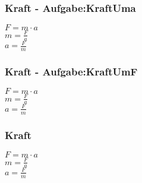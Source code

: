 \subsubsection{Kraft - Aufgabe:KraftUma} 
\begin{minipage}{0.45\textwidth} 
$ F = m\cdot a $\\ 
$ m = \frac{F}{a} $\\ 
$ a = \frac{F}{m} $\\ 
\end{minipage} 
\begin{minipage}{0.45\textwidth} 
 
\end{minipage} 
\subsubsection{Kraft - Aufgabe:KraftUmF} 
\begin{minipage}{0.45\textwidth} 
$ F = m\cdot a $\\ 
$ m = \frac{F}{a} $\\ 
$ a = \frac{F}{m} $\\ 
\end{minipage} 
\begin{minipage}{0.45\textwidth} 
 
\end{minipage} 
\subsubsection{Kraft} 
\begin{minipage}{0.45\textwidth} 
$ F = m\cdot a $\\ 
$ m = \frac{F}{a} $\\ 
$ a = \frac{F}{m} $\\ 
\end{minipage} 
\begin{minipage}{0.45\textwidth} 
 
\end{minipage} 
